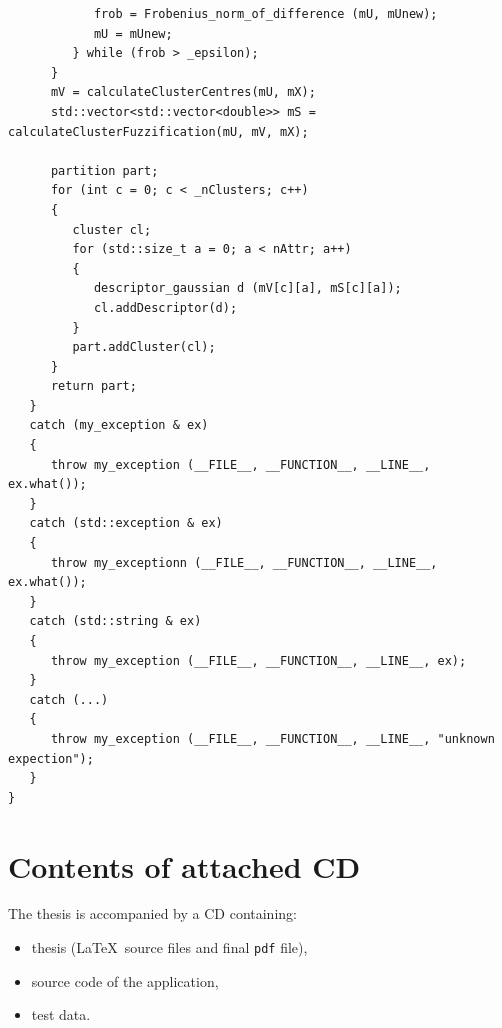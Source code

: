 \documentclass[a4paper,twoside,12pt]{book}
\begin{document}
\begin{appendices}
\begin{lstlisting}
            frob = Frobenius_norm_of_difference (mU, mUnew);
            mU = mUnew;
         } while (frob > _epsilon);
      }
      mV = calculateClusterCentres(mU, mX);
      std::vector<std::vector<double>> mS = calculateClusterFuzzification(mU, mV, mX);
      
      partition part;
      for (int c = 0; c < _nClusters; c++)
      {
         cluster cl; 
         for (std::size_t a = 0; a < nAttr; a++)
         {
            descriptor_gaussian d (mV[c][a], mS[c][a]);
            cl.addDescriptor(d);
         }
         part.addCluster(cl);
      }
      return part;
   }
   catch (my_exception & ex)                                  
   {                                                       
      throw my_exception (__FILE__, __FUNCTION__, __LINE__, ex.what()); 
   }                                                          
   catch (std::exception & ex)                                 
   {                                                            
      throw my_exceptionn (__FILE__, __FUNCTION__, __LINE__, ex.what()); 
   }                                                            
   catch (std::string & ex)                                     
   {                                                            
      throw my_exception (__FILE__, __FUNCTION__, __LINE__, ex);        
   }                                                             
   catch (...)                                                   
   {                                                             
      throw my_exception (__FILE__, __FUNCTION__, __LINE__, "unknown expection");       
   }  
}
\end{lstlisting} 

\chapter*{Contents of attached CD}

The thesis is accompanied by a CD containing:
\begin{itemize}
\item thesis (\LaTeX\ source files and final \texttt{pdf} file),
\item source code of the application,
\item test data.
\end{itemize}
 

\listoffigures
\listoftables
	
\end{appendices}
\end{document}
